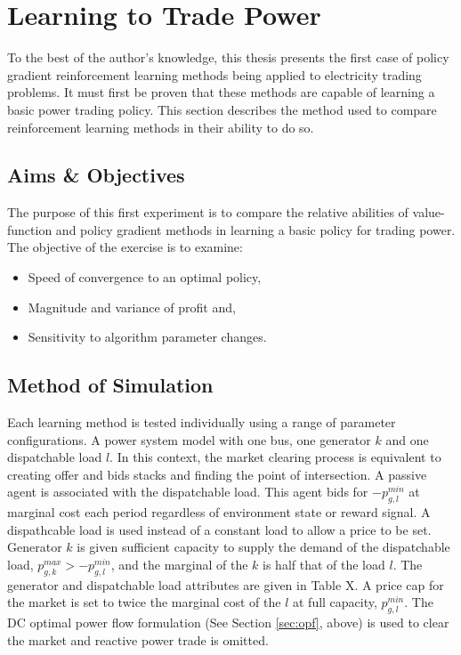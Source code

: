 \chapter{Learning to Trade Power}
\label{ch:learningtotrade}
To the best of the author's knowledge, this thesis presents the first case of
policy gradient reinforcement learning methods being applied to electricity
trading problems.  It must first be proven that these methods are capable of
learning a basic power trading policy.  This section describes the method used
to compare reinforcement learning methods in their ability to do so.

\section{Aims \& Objectives} The purpose of this first experiment is to
compare the relative abilities of value-function and policy gradient methods in
learning a basic policy for trading power.  The objective of the exercise is to
examine:
\begin{itemize}
  \item Speed of convergence to an optimal policy,
  \item Magnitude and variance of profit and,
  \item Sensitivity to algorithm parameter changes.
\end{itemize}

\section{Method of Simulation}
Each learning method is tested individually using a range of parameter
configurations.  A power system model with one bus, one generator $k$ and
one dispatchable load $l$.  In this
context, the market clearing process is equivalent to creating offer and bids
stacks and finding the point of intersection.  A passive agent is associated
with the dispatchable load.  This agent bids for $-p_{g,l}^{min}$ at marginal
cost each period regardless of environment state or reward signal.  A
dispathcable load is used instead of a constant load to allow a price to be
set. Generator $k$ is given sufficient capacity to supply the demand
of the dispatchable load, $p_{g,k}^{max} > -p_{g,l}^{min}$, and the marginal of
the $k$ is half that of the load $l$.  The generator and dispatchable load
attributes are given in Table X.  A price cap for the market is set to twice the
marginal cost of the $l$ at full capacity, $p_{g,l}^{min}$.  The DC optimal
power flow formulation (See Section \ref{sec:opf}, above) is used to clear the
market and reactive power trade is omitted.

